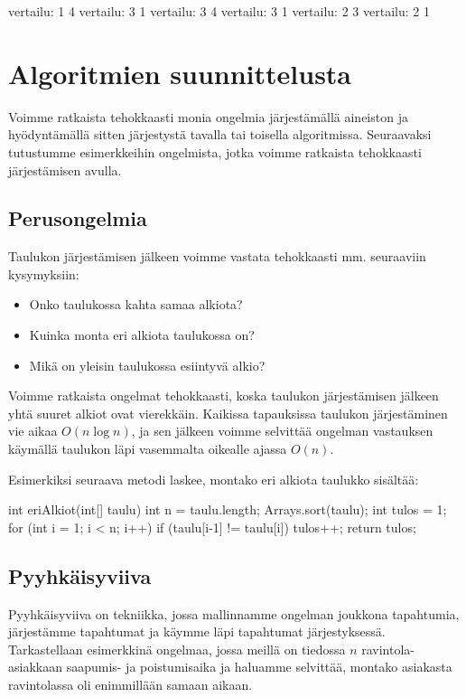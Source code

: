 \begin{code}
vertailu: 1 4
vertailu: 3 1
vertailu: 3 4
vertailu: 3 1
vertailu: 2 3
vertailu: 2 1
\end{code}

\section{Algoritmien suunnittelusta}

Voimme ratkaista tehokkaasti monia ongelmia järjestämällä
aineiston ja hyö\-dyntämällä sitten järjestystä tavalla tai toisella
algoritmissa.
Seuraavaksi tutustumme esimerkkeihin ongelmista, jotka voimme
ratkaista tehokkaasti järjes\-tämisen avulla.

\subsection{Perusongelmia}

Taulukon järjestämisen jälkeen voimme vastata tehokkaasti
mm. seuraaviin kysymyksiin:

\begin{itemize}
\item Onko taulukossa kahta samaa alkiota?
\item Kuinka monta eri alkiota taulukossa on?
\item Mikä on yleisin taulukossa esiintyvä alkio?
\end{itemize}

Voimme ratkaista ongelmat tehokkaasti, koska taulukon järjestämisen
jälkeen yhtä suuret alkiot ovat vierekkäin.
Kaikissa tapauksissa taulukon järjestäminen vie aikaa $O(n \log n)$,
ja sen jälkeen voimme selvittää ongelman vastauksen
käymällä taulukon läpi vasemmalta oikealle ajassa $O(n)$.

Esimerkiksi seuraava metodi laskee, montako eri alkiota
taulukko sisältää:

\begin{code}
int eriAlkiot(int[] taulu) {
    int n = taulu.length;
    Arrays.sort(taulu);
    int tulos = 1;
    for (int i = 1; i < n; i++) {
        if (taulu[i-1] != taulu[i]) tulos++;
    }
    return tulos;
}
\end{code}

\subsection{Pyyhkäisyviiva}

Pyyhkäisyviiva on tekniikka, jossa mallinnamme ongelman joukkona
tapahtumia, järjestämme tapahtumat ja käymme läpi tapahtumat
järjestyksessä.
Tarkastellaan esimerkkinä ongelmaa, jossa meillä on tiedossa
$n$ ravintola-asiakkaan saapumis- ja poistumisaika
ja haluamme selvittää, montako asiakasta ravintolassa oli
enimmillään samaan aikaan.

